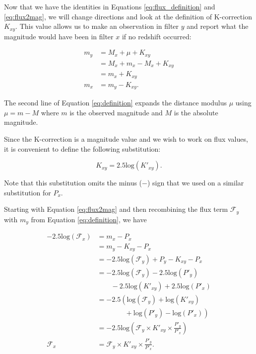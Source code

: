 \documentclass[aps,prl,reprint,amsmath,floatfix]{revtex4-2}
\begin{document}
Now that we have the identities in Equations \ref{eq:flux_definition} and
\ref{eq:flux2mag}, we will change directions and look at the definition of
K-correction $K_{xy}$. This value allows us to make an observation in filter
$y$ and report what the magnitude would have been in filter $x$ if no redshift
occurred:

\begin{equation}
\begin{aligned}
\label{eq:definition}
  m_y &= M_x + \mu + K_{xy} \\
      &= M_x + m_x - M_x + K_{xy} \\
      &= m_x + K_{xy} \\
  m_x &= m_y - K_{xy} .
\end{aligned}
\end{equation}

\noindent The second line of Equation \ref{eq:definition} expands the distance modulus
$\mu$ using $\mu = m - M$ where $m$ is the observed magnitude and $M$ is the
absolute magnitude.

Since the K-correction is a magnitude value and we wish to work on flux values,
it is convenient to define the following substitution:

\begin{equation}
\label{eq:k_substitution}
  K_{xy} = 2.5\text{log}(K'_{xy}) .
\end{equation}

\noindent Note that this substitution omits the minus ($-$) sign that we used on a
similar substitution for $P_x$.

Starting with Equation \ref{eq:flux2mag} and then
recombining the flux term $\mathcal{F}_y$ with $m_y$ from Equation
\ref{eq:definition}, we have

\begin{equation}
\begin{aligned}
\label{eq:as_flux}
  -2.5 \text{log}(\mathcal{F}_x)
      &= m_x - P_x \\
      &= m_y - K_{xy} - P_x \\
      &= -2.5 \text{log}(\mathcal{F}_y) + P_y - K_{xy} - P_x \\
      &= -2.5 \text{log}(\mathcal{F}_y) - 2.5 \text{log}(P'_y) \\
         &\qquad - 2.5 \text{log}(K'_{xy}) + 2.5 \text{log}(P'_x) \\
      &= -2.5 \left(\text{log}(\mathcal{F}_y) + \text{log}(K'_{xy}) \right. \\
         &\qquad\qquad + \left. \text{log}(P'_y) - \text{log}(P'_x)
        \right) \\
      &= -2.5 \text{log}\left(
        \mathcal{F}_y
        \times K'_{xy}
        \times \frac{P'_y}{P'_x}\right) \\
  \mathcal{F}_x &= \mathcal{F}_y \times K'_{xy} \times \frac{P'_y}{P'_x}.
\end{aligned}
\end{equation}
\end{document}
